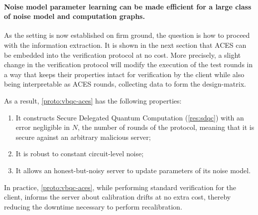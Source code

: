 \paragraph{Noise model parameter learning can be made efficient for a large class of noise model and computation graphs.}
As the setting is now established on firm ground, the question is how to proceed with the information extraction. It is shown in the next section that ACES can be embedded into the verification protocol at no cost. More precisely, a slight change in the verification protocol will modify the execution of the test rounds in a way that keeps their properties intact for verification by the client while also being interpretable as ACES rounds, collecting data to form the design-matrix.

As a result, \cref{proto:vbqc-aces} has the following properties:
\begin{enumerate}
\item It constructs Secure Delegated Quantum Computation (\cref{res:sdqc}) with an error negligible in $N$, the number of rounds of the protocol, meaning that it is secure against an arbitrary malicious server;
\item It is robust to constant circuit-level noise;
\item It allows an honest-but-noisy server to update parameters of its noise model.
\end{enumerate}

In practice, \cref{proto:vbqc-aces}, while performing standard verification for the client, informs the server about calibration drifts at no extra cost, thereby reducing the downtime necessary to perform recalibration.
